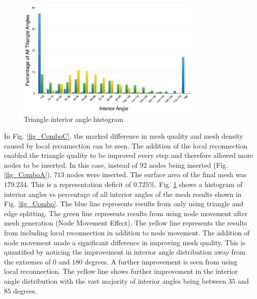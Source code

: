 \begin{figure}[h!]
  \begin{center}
  \includegraphics[width=90mm]{Figures/MeshQuality.png}
  \caption{Triangle interior angle histogram}
  \label{fig_MeshQuality}
  \end{center}
\end{figure}

In Fig. \ref{fig_ComboC}, the marked difference in mesh quality and mesh
density caused by local reconnection can be seen. The addition of the
local reconnection enabled the triangle quality to be improved every
step and therefore allowed more nodes to be inserted. In this case,
instead of $92$ nodes being inserted (Fig. \ref{fig_ComboA}), $713$
nodes were inserted. The surface area of the final mesh was $179.234$.
This is a representation deficit of $0.725\%$.  Fig.
\ref{fig_MeshQuality} shows a histogram of interior angles vs percentage
of all interior angles of the mesh results shown in Fig.
\ref{fig_Combo}. The blue line represents results from only using
triangle and edge splitting. The green line represents results from
using node movement after mesh generation (Node Movement Effect). The
yellow line represents the results from including local reconnection in
addition to node movement. The addition of node movement made a
significant difference in improving mesh quality. This is quantified
by noticing the improvement in interior angle distribution away from the
extremes of $0$ and $180$ degrees. A further improvement is seen from
using local reconnection. The yellow line shows further improvement in
the interior angle distribution with the vast majority of interior
angles being between $35$ and $85$ degrees.

